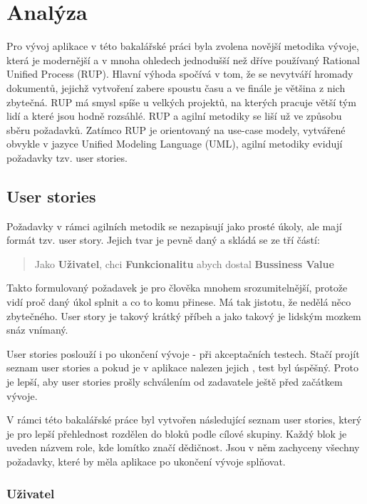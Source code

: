 \chapter{Analýza}

Pro vývoj aplikace v této bakalářské práci byla zvolena novější metodika vývoje, která je modernější a v mnoha ohledech jednodušší než dříve používaný Rational Unified Process (RUP). Hlavní výhoda spočívá v tom, že se nevytváří hromady dokumentů, jejichž vytvoření zabere spoustu času a ve finále je většina z nich zbytečná. RUP má smysl spíše u velkých projektů, na kterých pracuje větší tým lidí a které jsou hodně rozsáhlé. RUP a agilní metodiky se liší už ve způsobu sběru požadavků. Zatímco RUP je orientovaný na use-case modely, vytvářené obvykle v jazyce Unified Modeling Language (UML), agilní metodiky evidují požadavky tzv. user stories.

\section{User stories}

Požadavky v rámci agilních metodik se nezapisují jako prosté úkoly, ale mají formát tzv. user story. Jejich tvar je pevně daný a skládá se ze tří částí:
\begin{quote}
Jako \textbf{Uživatel}, chci \textbf{Funkcionalitu} abych dostal \textbf{Bussiness Value}
\end{quote}

Takto formulovaný požadavek je pro člověka mnohem srozumitelnější, protože vidí proč daný úkol splnit a co to komu přinese. Má tak jistotu, že nedělá něco zbytečného. User story je takový krátký příbeh a jako takový je lidským mozkem snáz vnímaný.

User stories poslouží i po ukončení vývoje - při akceptačních testech. Stačí projít seznam user stories a pokud je v aplikace nalezen jejich , test byl úspěšný. Proto je lepší, aby user stories prošly schválením od zadavatele ještě před začátkem vývoje.

V rámci této bakalářské práce byl vytvořen následující seznam user stories, který je pro lepší přehlednost rozdělen do bloků podle cílové skupiny. Každý blok je uveden názvem role, kde lomítko značí dědičnost. Jsou v něm zachyceny všechny požadavky, které by měla aplikace po ukončení vývoje splňovat.

\subsection{Uživatel}

